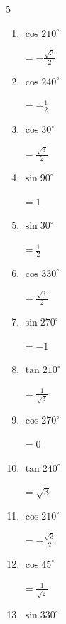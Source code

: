 \begin{multicols}{5}
\begin{enumerate}
\columnbreak %

\resetques

  \item $\displaystyle \cos{210^\circ}$

        $\displaystyle =-\frac{\sqrt{3}}{2}$

  \item $\displaystyle \cos{240^\circ}$

        $\displaystyle =-\frac{1}{2}$

  \item $\displaystyle \cos{30^\circ}$

        $\displaystyle =\frac{\sqrt{3}}{2}$

  \item $\displaystyle \sin{90^\circ}$

        $\displaystyle =1$

  \item $\displaystyle \sin{30^\circ}$

        $\displaystyle =\frac{1}{2}$

  \item $\displaystyle \cos{330^\circ}$

        $\displaystyle =\frac{\sqrt{3}}{2}$

  \item $\displaystyle \sin{270^\circ}$

        $\displaystyle =-1$

  \item $\displaystyle \tan{210^\circ}$

        $\displaystyle =\frac{1}{\sqrt{3}}$

  \item $\displaystyle \cos{270^\circ}$

        $\displaystyle =0$

  \item $\displaystyle \tan{240^\circ}$

        $\displaystyle =\sqrt{3}$

  \item $\displaystyle \cos{210^\circ}$

        $\displaystyle =-\frac{\sqrt{3}}{2}$

  \item $\displaystyle \cos{45^\circ}$

        $\displaystyle =\frac{1}{\sqrt{2}}$

  \item $\displaystyle \sin{330^\circ}$


\end{enumerate}
\end{multicols}
